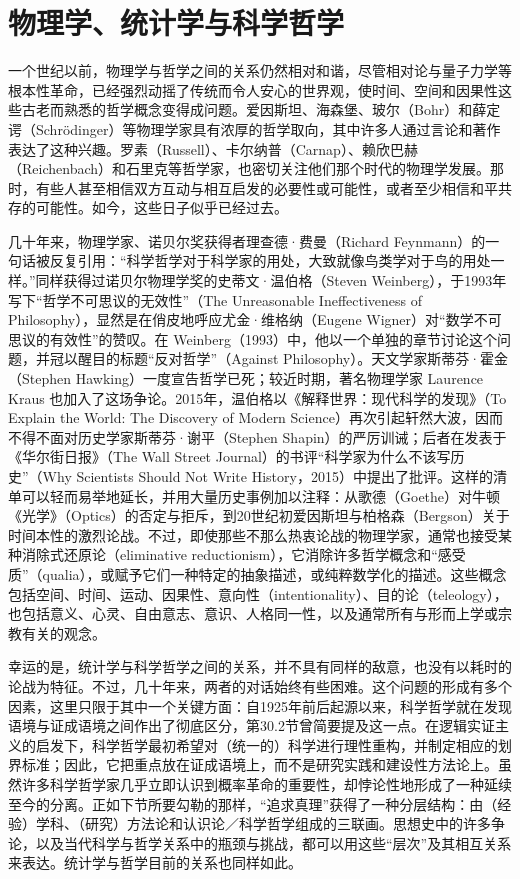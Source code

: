 \section{物理学、统计学与科学哲学}

一个世纪以前，物理学与哲学之间的关系仍然相对和谐，尽管相对论与量子力学等根本性革命，已经强烈动摇了传统而令人安心的世界观，使时间、空间和因果性这些古老而熟悉的哲学概念变得成问题。爱因斯坦、海森堡、玻尔（Bohr）和薛定谔（Schrödinger）等物理学家具有浓厚的哲学取向，其中许多人通过言论和著作表达了这种兴趣。罗素（Russell）、卡尔纳普（Carnap）、赖欣巴赫（Reichenbach）和石里克等哲学家，也密切关注他们那个时代的物理学发展。那时，有些人甚至相信双方互动与相互启发的必要性或可能性，或者至少相信和平共存的可能性。如今，这些日子似乎已经过去。

几十年来，物理学家、诺贝尔奖获得者理查德·费曼（Richard Feynmann）的一句话被反复引用：“科学哲学对于科学家的用处，大致就像鸟类学对于鸟的用处一样。”同样获得过诺贝尔物理学奖的史蒂文·温伯格（Steven Weinberg），于1993年写下“哲学不可思议的无效性”（The Unreasonable Ineffectiveness of Philosophy），显然是在俏皮地呼应尤金·维格纳（Eugene Wigner）对“数学不可思议的有效性”的赞叹。在 Weinberg（1993）中，他以一个单独的章节讨论这个问题，并冠以醒目的标题“反对哲学”（Against Philosophy）。天文学家斯蒂芬·霍金（Stephen Hawking）一度宣告哲学已死；较近时期，著名物理学家 Laurence Kraus 也加入了这场争论。2015年，温伯格以《解释世界：现代科学的发现》（To Explain the World: The Discovery of Modern Science）再次引起轩然大波，因而不得不面对历史学家斯蒂芬·谢平（Stephen Shapin）的严厉训诫；后者在发表于《华尔街日报》（The Wall Street Journal）的书评“科学家为什么不该写历史”（Why Scientists Should Not Write History，2015）中提出了批评。这样的清单可以轻而易举地延长，并用大量历史事例加以注释：从歌德（Goethe）对牛顿《光学》（Optics）的否定与拒斥，到20世纪初爱因斯坦与柏格森（Bergson）关于时间本性的激烈论战。不过，即使那些不那么热衷论战的物理学家，通常也接受某种消除式还原论（eliminative reductionism），它消除许多哲学概念和“感受质”（qualia），或赋予它们一种特定的抽象描述，或纯粹数学化的描述。这些概念包括空间、时间、运动、因果性、意向性（intentionality）、目的论（teleology），也包括意义、心灵、自由意志、意识、人格同一性，以及通常所有与形而上学或宗教有关的观念。

幸运的是，统计学与科学哲学之间的关系，并不具有同样的敌意，也没有以耗时的论战为特征。不过，几十年来，两者的对话始终有些困难。这个问题的形成有多个因素，这里只限于其中一个关键方面：自1925年前后起源以来，科学哲学就在发现语境与证成语境之间作出了彻底区分，第30.2节曾简要提及这一点。在逻辑实证主义的启发下，科学哲学最初希望对（统一的）科学进行理性重构，并制定相应的划界标准；因此，它把重点放在证成语境上，而不是研究实践和建设性方法论上。虽然许多科学哲学家几乎立即认识到概率革命的重要性，却悖论性地形成了一种延续至今的分离。正如下节所要勾勒的那样，“追求真理”获得了一种分层结构：由（经验）学科、（研究）方法论和认识论／科学哲学组成的三联画。思想史中的许多争论，以及当代科学与哲学关系中的瓶颈与挑战，都可以用这些“层次”及其相互关系来表达。统计学与哲学目前的关系也同样如此。


